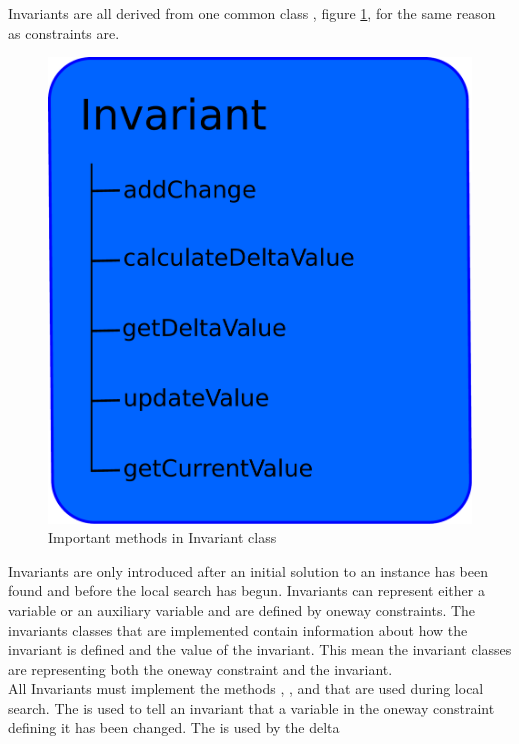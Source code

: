 Invariants are all derived from one common class , figure \ref{fig_invariant}, for the same reason as 
constraints are. 
\begin{figure}[!b]
\begin{center}
 \includegraphics[width=\linewidth/2]{invariant.pdf} \caption{Important methods in Invariant 
class}\label{fig_invariant}
\end{center} 
\end{figure}
Invariants are only introduced after an initial solution to an instance has been found and before the local 
search has begun. Invariants can represent either a variable or an auxiliary variable and are defined by oneway 
constraints. The invariants classes that are implemented contain information about how the invariant is defined and the 
value of the invariant. This mean the invariant classes are representing both the oneway constraint and the invariant. 
\\
All Invariants must implement the methods , , and 
 that are used during local search. The  is used to tell an invariant that a 
variable in the oneway constraint defining it has been changed. The  is used by the delta 
